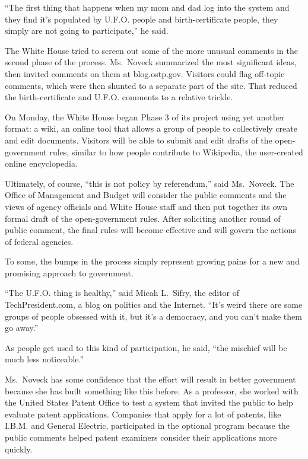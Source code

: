 ﻿\documentclass[12pt]{article}
\begin{document}
``The first thing that happens when my mom and dad log into the system and they find it's populated
by U.F.O. people and birth-certificate people, they simply are not going to participate,'' he said.

The White House tried to screen out some of the more unusual comments in the second phase of the
process. Ms.~Noveck summarized the most significant ideas, then invited comments on them at
blog.ostp.gov. Visitors could flag off-topic comments, which were then shunted to a separate part of
the site. That reduced the birth-certificate and U.F.O. comments to a relative trickle.

On Monday, the White House began Phase 3 of its project using yet another format: a wiki, an online
tool that allows a group of people to collectively create and edit documents. Visitors will be able
to submit and edit drafts of the open-government rules, similar to how people contribute to
Wikipedia, the user-created online encyclopedia.

Ultimately, of course, ``this is not policy by referendum,'' said Ms.~Noveck. The Office of
Management and Budget will consider the public comments and the views of agency officials and White
House staff and then put together its own formal draft of the open-government rules. After
soliciting another round of public comment, the final rules will become effective and will govern
the actions of federal agencies.

To some, the bumps in the process simply represent growing pains for a new and promising approach to
government.

``The U.F.O. thing is healthy,'' said Micah L.~Sifry, the editor of TechPresident.com, a blog on
politics and the Internet. ``It's weird there are some groups of people obsessed with it, but it's a
democracy, and you can't make them go away.''

As people get used to this kind of participation, he said, ``the mischief will be much less
noticeable.''

Ms.~Noveck has some confidence that the effort will result in better government because she has built something like this before. As a professor, she worked with the United States Patent Office to test a system that invited the public to help evaluate patent applications. Companies that apply for a lot of patents, like I.B.M. and General Electric, participated in the optional program because the public comments helped patent examiners consider their applications more quickly.
\end{document}
